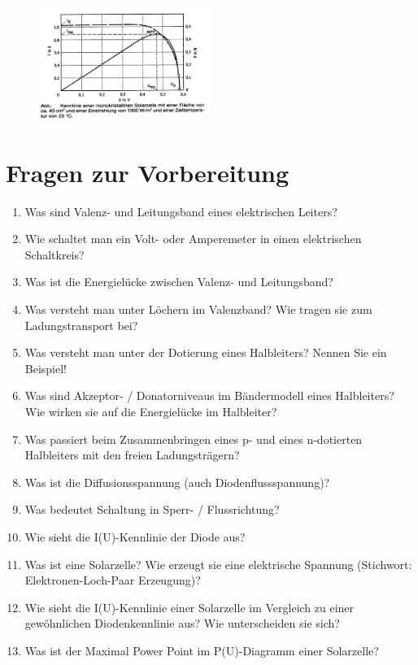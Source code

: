 \begin{figure}[h]
	\centering
		\includegraphics[width=0.5\textwidth]{Versuch_17-18/Abbildungen/Leistung.jpg}
	\label{fig:Leistung}
\end{figure}

\section{Fragen zur Vorbereitung}

\begin{enumerate}
	\item Was sind Valenz- und Leitungsband eines elektrischen Leiters?
	\item Wie schaltet man ein Volt- oder Amperemeter in einen elektrischen Schaltkreis?
	\item Was ist die Energielücke zwischen Valenz- und Leitungsband?
	\item Was versteht man unter Löchern im Valenzband? Wie tragen sie zum Ladungstransport bei?
	\item Was versteht man unter der Dotierung eines Halbleiters? Nennen Sie ein Beispiel!
	\item Was sind Akzeptor- / Donatorniveaus im Bändermodell eines Halbleiters? Wie wirken sie auf die Energielücke im Halbleiter?
	\item Was passiert beim Zusammenbringen eines p- und eines n-dotierten Halbleiters mit den freien Ladungsträgern?
	\item Was ist die Diffusionsspannung (auch Diodenflussspannung)?
	\item Was bedeutet Schaltung in Sperr- / Flussrichtung?
	\item Wie sieht die I(U)-Kennlinie der Diode aus? %
	\item Was ist eine Solarzelle? Wie erzeugt sie eine elektrische Spannung (Stichwort: Elektronen-Loch-Paar Erzeugung)?
	\item Wie sieht die I(U)-Kennlinie einer Solarzelle im Vergleich zu einer gewöhnlichen Diodenkennlinie aus? Wie unterscheiden sie sich?
	\item Was ist der Maximal Power Point im P(U)-Diagramm einer Solarzelle?
\end{enumerate}

